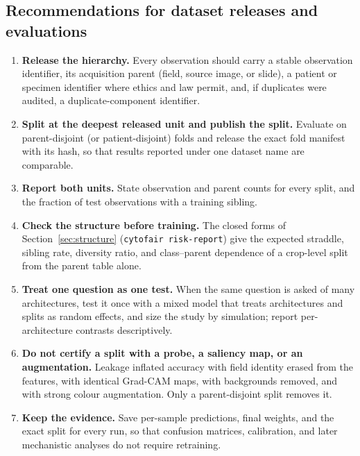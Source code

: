 \subsection{Recommendations for dataset releases and evaluations}
\label{sec:recommendations}

\begin{enumerate}
\item \textbf{Release the hierarchy.} Every observation should carry a stable
  observation identifier, its acquisition parent (field, source image, or slide), a
  patient or specimen identifier where ethics and law permit, and, if duplicates were
  audited, a duplicate-component identifier.
\item \textbf{Split at the deepest released unit and publish the split.} Evaluate on
  parent-disjoint (or patient-disjoint) folds and release the exact fold manifest with
  its hash, so that results reported under one dataset name are comparable.
\item \textbf{Report both units.} State observation and parent counts for every split,
  and the fraction of test observations with a training sibling.
\item \textbf{Check the structure before training.} The closed forms of
  Section~\ref{sec:structure} (\texttt{cytofair risk-report}) give the expected straddle,
  sibling rate, diversity ratio, and class--parent dependence of a crop-level split from
  the parent table alone.
\item \textbf{Treat one question as one test.} When the same question is asked of many
  architectures, test it once with a mixed model that treats architectures and splits as
  random effects, and size the study by simulation; report per-architecture contrasts
  descriptively.
\item \textbf{Do not certify a split with a probe, a saliency map, or an augmentation.} Leakage
  inflated accuracy with field identity erased from the features, with identical Grad-CAM maps,
  with backgrounds removed, and with strong colour augmentation. Only a parent-disjoint split
  removes it.
\item \textbf{Keep the evidence.} Save per-sample predictions, final weights, and the
  exact split for every run, so that confusion matrices, calibration, and later
  mechanistic analyses do not require retraining.
\end{enumerate}
